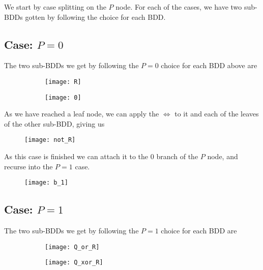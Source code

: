 \documentclass[11pt]{article}
\begin{document}
We start by case splitting on the $P$ node. For each of the cases, we have two sub-BDDs gotten by following the choice for each BDD.

\pagebreak

\subsection{Case: $P=0$}

The two sub-BDDs we get by following the $P=0$ choice for each BDD above are

\begin{figure}[H]
  \centering
  \begin{subfigure}{0.49\textwidth}
    \centering
    \texttt{[image: R]}
  \end{subfigure}
  \begin{subfigure}{0.49\textwidth}
    \centering
    \texttt{[image: 0]}
  \end{subfigure}
\end{figure}

As we have reached a leaf node, we can apply the $\iff$ to it and each of the leaves of the other sub-BDD, giving us

\begin{figure}[H]
	\centering
	\texttt{[image: not\_R]}
\end{figure}

As this case is finished we can attach it to the $0$ branch of the $P$ node, and recurse into the $P=1$ case.

\begin{figure}[H]
	\centering
	\texttt{[image: b\_1]}
\end{figure}

\subsection{Case: $P=1$}

The two sub-BDDs we get by following the $P=1$ choice for each BDD are

\begin{figure}[H]
  \centering
  \begin{subfigure}{0.49\textwidth}
    \centering
    \texttt{[image: Q\_or\_R]}
  \end{subfigure}
  \begin{subfigure}{0.49\textwidth}
    \centering
    \texttt{[image: Q\_xor\_R]}
  \end{subfigure}
\end{figure}
\end{document}
